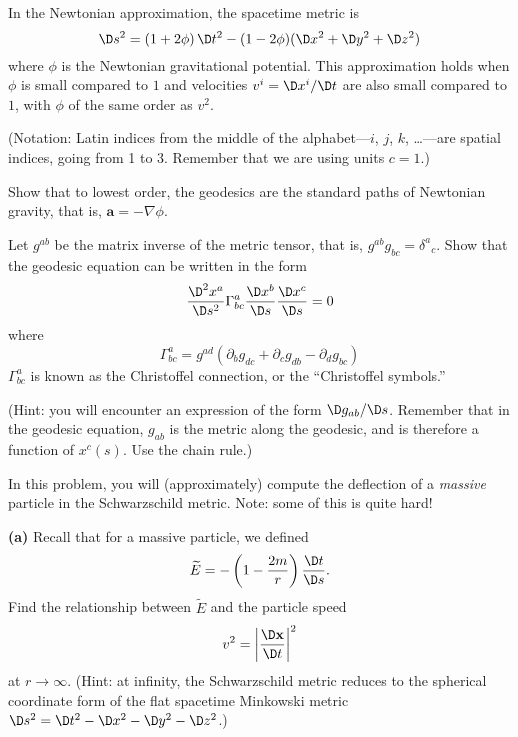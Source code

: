 \begin{exercises}
\begin{xca}
In the Newtonian approximation, the spacetime metric is
\begin{equation}
\D s^2 = (1 + 2\phi)\,\D t^2 - (1 - 2\phi)(\D x^2 + \D y^2 + \D z^2)
\end{equation}
where $\phi$ is the Newtonian gravitational potential. This
approximation holds when $\phi$ is small compared to $1$ and
velocities $v^i = \D x^i/\D t$ are also small compared to $1$,
with $\phi$ of the same order as $v^2$. 

(Notation: Latin indices from the middle of the alphabet---$i$,
$j$, $k$, \dots---are spatial indices, going from 1 to
3. Remember that we are using units $c = 1$.) 

Show that to lowest order, the geodesics are the standard paths of Newtonian gravity, that
is, $\mathbf{a} = -\nabla\phi$. 
\end{xca}
\begin{xca}
Let $g^{ab}$ be the matrix inverse of the metric tensor, that is,
$g^{ab} g_{bc} = {\delta^{a}}_{c}$. Show that the geodesic
equation can be written in the form 
\begin{equation}
\frac{\D^{2}x^{a}}{\D s^{2}}
\Gamma^{a}_{bc}\frac{\D x^{b}}{\D s}\frac{\D x^{c}}{\D s}=0
\end{equation}
where
\begin{equation}
\Gamma^{a}_{bc} = g^{ad} (\partial_{b} g_{dc} + \partial_{c}
g_{db} - \partial_{d} g_{bc}) 
\end{equation}
$\Gamma^{a}_{bc}$ is known as the Christoffel connection, or the ``Christoffel symbols.''

(Hint: you will encounter an expression of the form $\D g_{ab}/\D s$. 
Remember that in the geodesic equation, $g_{ab}$ is the metric
along the geodesic, and is therefore a function of
$x^{c}(s)$. Use the chain rule.) 
\end{xca}
\begin{xca}
In this problem, you will (approximately) compute the deflection
of a \emph{massive} particle in the Schwarzschild metric. Note:
some of this is quite hard! 

\textbf{(a)}
Recall that for a massive particle, we defined
\begin{equation}
\widetilde{E}=-\left(
1-\frac{2m}{r}\right)\frac{\D t}{\D s}.
\end{equation}
Find the relationship between $\widetilde{E}$ and the particle speed
\begin{equation}
v^{2} =
\left|\frac{\D\mathbf{x}}{\D t}\right|^{2}
\end{equation}
at $r\to\infty$. (Hint: at infinity, the Schwarzschild metric
reduces to the spherical coordinate 
form of the flat spacetime Minkowski metric $\D s^2 = \D t^2-\D x^2-\D y^2-\D z^2$.)


\end{xca}
\end{exercises}
